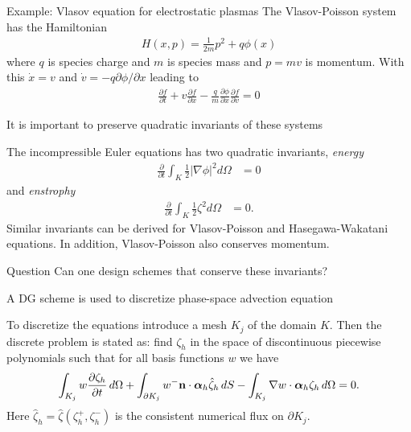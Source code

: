 \documentclass[pdf]{beamer}
\newcommand{\pfrac}[2]{\frac{\partial #1}{\partial #2}}
\newcommand{\pfraca}[1]{\frac{\partial}{\partial #1}}
\newcommand{\mvec}[1]{\mathbf{#1}}
\newcommand{\gvec}[1]{\boldsymbol{#1}}
\newcommand{\mypause}{}
\theoremstyle{definition}
\begin{document}
\begin{frame}{Example: Vlasov equation for electrostatic plasmas}%
  The Vlasov-Poisson system has the Hamiltonian
  \begin{align*}
    H(x,p) = \frac{1}{2m}p^2 + q\phi(x)
  \end{align*}
  where $q$ is species charge and $m$ is species mass and $p=mv$ is
  momentum. With this $\dot{x} = v$ and $\dot{v} =
  -q\partial\phi/\partial x$ leading to
  \begin{align*}
    \pfrac{f}{t} + v\pfrac{f}{x} -
    \frac{q}{m}\pfrac{\phi}{x}\pfrac{f}{v} = 0
  \end{align*}
\end{frame}

\begin{frame}{It is important to preserve quadratic invariants of
    these systems}%

  The incompressible Euler equations has two quadratic invariants,
  \emph{energy}
  \begin{align*}
    \pfraca{t}\int_K \frac{1}{2} |\nabla\phi|^2  d\Omega &= 0
  \end{align*}
  and \emph{enstrophy}
  \begin{align*}
    \pfraca{t}\int_K \frac{1}{2}\zeta^2 d\Omega &= 0.
  \end{align*}
  Similar invariants can be derived for Vlasov-Poisson and
  Hasegawa-Wakatani equations.  In addition, Vlasov-Poisson also
  conserves momentum.
  \mypause
  \begin{block}{Question}
    Can one design schemes that conserve these invariants?
  \end{block}

\end{frame}

\begin{frame}{A DG scheme is used to discretize phase-space advection
    equation}

  To discretize the equations introduce a mesh $K_j$ of the domain
  $K$. Then the discrete problem is stated as: find $\zeta_h$ in the
  space of discontinuous piecewise polynomials such that for all basis
  functions $w$ we have
  \begin{align*}
    \int_{K_j} w \pfrac{\zeta_h}{t}\thinspace d\Omega 
    +
    \int_{\partial K_j}w^- \mvec{n}\cdot\gvec{\alpha}_h\hat{\zeta}_h\thinspace dS
    -
    \int_{K_j} \nabla w\cdot\gvec{\alpha}_h \zeta_h\thinspace d\Omega = 0.
  \end{align*}
  Here $\hat{\zeta}_h = \hat{\zeta}(\zeta^+_h,\zeta^-_h)$ is the
  consistent numerical flux on $\partial K_j$.
\end{frame}
\end{document}
